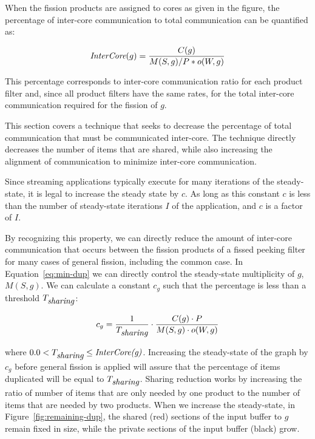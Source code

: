 When the fission products are assigned to
cores as given in the figure, the percentage of inter-core
communication to total communication can be quantified as:

\begin{equation}
\label{eq:min-dup}
\mt{InterCore}(g) = \frac{C(g)}{M(S,g) / P * o(W, g)}
\end{equation}

\noindent This percentage corresponds to inter-core communication
ratio for each product filter and, since all product filters have the
same rates, for the total inter-core communication required for the
fission of $g$.

This section covers a technique that seeks to decrease the percentage
of total communication that must be communicated inter-core.  The
technique directly decreases the number of items that are shared,
while also increasing the alignment of communication to minimize
inter-core communication.

Since streaming applications typically execute for many iterations of
the steady-state, it is legal to increase the steady state by $c$.  As
long as this constant $c$ is less than the number of steady-state
iterations $I$ of the application, and $c$ is a factor of $I$.

By recognizing this property, we can directly reduce the amount of
inter-core communication that occurs between the fission products of a
fissed peeking filter for many cases of general fission, including the
common case.  In Equation~\ref{eq:min-dup} we can directly control the
steady-state multiplicity of $g$, $M(S,g)$.  We can calculate a
constant $c_g$ such that the percentage is less than a threshold
$T_{\mbox{\it sharing}}$:

\begin{equation}
\label{eq:ic-thresh}
c_g = \frac{1}{T_{\mt{sharing}}} \cdot \frac{C(g) \cdot P}{M(S,g) \cdot o(W,g)}
\end{equation}

\noindent where $0.0 < T_{\mbox{\it sharing}} \le
\mbox{\it InterCore(g)}$. Increasing the steady-state of the graph by $c_g$
before general fission is applied will assure that the percentage of
items duplicated will be equal to $T_{\mbox{\it sharing}}$.  Sharing
reduction works by increasing the ratio of number of items that are
only needed by one product to the number of items that are needed by
two products.  When we increase the steady-state, in
Figure~\ref{fig:remaining-dup}, the shared (red) sections of the input
buffer to $g$ remain fixed in size, while the private sections of the
input buffer (black) grow.

